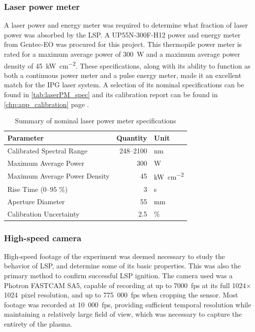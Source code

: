             \subsubsection*{Laser power meter}
                A laser power and energy meter was required to determine what fraction of laser power was absorbed by the LSP. A UP55N-300F-H12 power and energy meter from Gentec-EO was procured for this project. This thermopile power meter is rated for a maximum average power of 300~W and a maximum average power density of \qty{45}{kW\per cm^2}. These specifications, along with its ability to function as both a continuous power meter and a pulse energy meter, made it an excellent match for the IPG laser system. A selection of its nominal specifications can be found in \autoref{tab:laserPM_spec} and its calibration report can be found in \autoref{chp:app_calibration} page \pageref*{ds:laserPM}.

                \begin{table}[h]
                    \centering
                    \caption{Summary of nominal laser power meter specifications}
                    \label{tab:laserPM_spec}
                    \begin{tabular}{@{}lrl@{}}
                        \toprule
                        \textbf{Parameter}            & \textbf{Quantity} & \textbf{Unit} \\ \midrule
                        Calibrated Spectral Range     & 248--2100         & nm            \\
                        Maximum Average Power         & 300               & W             \\
                        Maximum Average Power Density & 45                & \unit{kW\per cm^2}             \\
                        Rise Time (0--95 \%)          & 3                 & s            \\
                        Aperture Diameter             & 55                & mm           \\ 
                        Calibration Uncertainty       & 2.5               & \% \\
                        \bottomrule
                        \end{tabular}
                \end{table}

            \subsubsection*{High-speed camera}
                High-speed footage of the experiment was deemed necessary to study the behavior of LSP, and determine some of its basic properties. This was also the primary method to confirm successful LSP ignition. The camera used was a Photron FASTCAM SA5, capable of recording at up to 7000~fps at its full 1024$\times$1024~pixel resolution, and up to 775~000~fps when cropping the sensor. Most footage was recorded at 10~000~fps, providing sufficient temporal resolution while maintaining a relatively large field of view, which was necessary to capture the entirety of the plasma.

